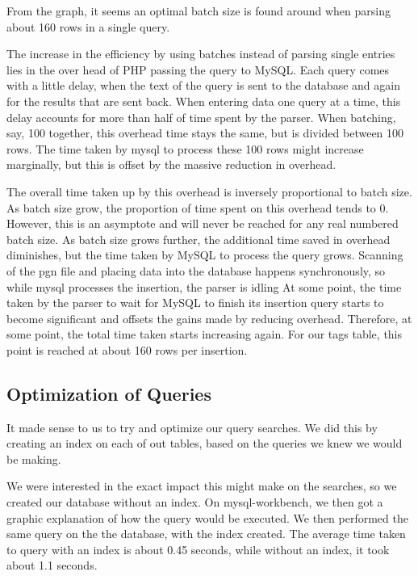 \documentclass{article}
\begin{document}
From the graph, it seems an optimal batch size is found around when parsing
about 160 rows in a single query.

The increase in the efficiency by using batches instead of parsing single
entries lies in the over head of PHP passing the query to MySQL.  Each
query comes with a little delay, when the text of the query is sent to the
database and again for the results that are sent back.  When entering data
one query at a time, this delay accounts for more than half of time spent
by the parser.  When batching, say, 100 together, this overhead time stays
the same, but is divided between 100 rows.  The time taken by mysql to
process these 100 rows might increase marginally, but this is offset by the
massive reduction in overhead.

The overall time taken up by this overhead is inversely proportional to
batch size.  As batch size grow, the proportion of time spent on this overhead tends to
0. However, this is an asymptote and will never be reached for any real
numbered batch size.  As batch size grows further, the additional time
saved in overhead diminishes, but the time taken by MySQL to process the
query grows.  Scanning of the pgn file and placing data into the database
happens synchronously, so while mysql processes the insertion, the parser is
idling  At some point, the time taken by the parser to wait for MySQL to
finish its insertion query starts to become significant and offsets the
gains made by reducing overhead.  Therefore, at some point, the total time
taken starts increasing again.  For our tags table, this point is reached
at about 160 rows per insertion.

\subsection{Optimization of Queries}
It made sense to us to try and optimize our query searches.  We did this by
creating an index on each of out tables, based on the queries we knew we
would be making.

We were interested in the exact impact this might make on the searches, so
we created our database without an index.  On mysql-workbench, we then got
a graphic explanation of how the query would be executed. We then performed
the same query on the the database, with the index created.
The average time taken to query with an index is about 0.45 seconds, while
without an index, it took about 1.1 seconds.
\end{document}
